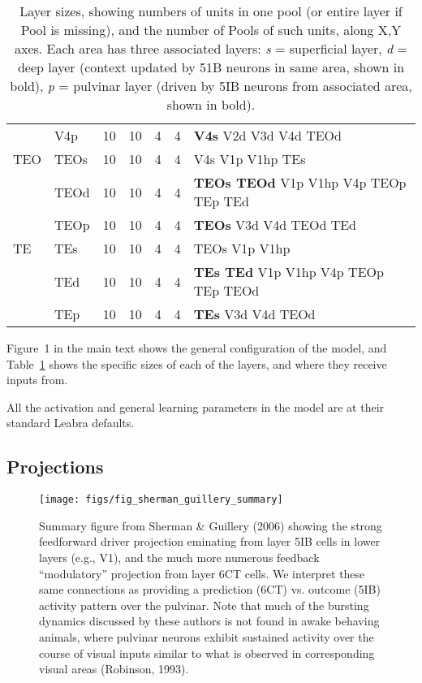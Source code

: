 \documentclass[12pt,twoside]{article}
\newif\myifpdf
\begin{document}
\begin{table}
\begin{tabular}{llrrlll}
   & V4p & 10 & 10 & 4 & 4 & {\bf V4s} V2d V3d V4d TEOd \\
TEO & TEOs & 10 & 10 & 4 & 4 & V4s V1p V1hp TEs\\
   & TEOd & 10 & 10 & 4 & 4 & {\bf TEOs TEOd} V1p V1hp V4p TEOp TEp TEd \\
   & TEOp & 10 & 10 & 4 & 4 & {\bf TEOs} V3d V4d TEOd TEd \\
TE & TEs & 10 & 10 & 4 & 4 & TEOs V1p V1hp \\
   & TEd & 10 & 10 & 4 & 4 & {\bf TEs TEd} V1p V1hp V4p TEOp TEp TEOd \\
   & TEp & 10 & 10 & 4 & 4 & {\bf TEs} V3d V4d TEOd \\
\hline
\end{tabular}
\caption{Layer sizes, showing numbers of units in one pool (or entire layer if Pool is missing), and the number of Pools of such units, along X,Y axes.  Each area has three associated layers: {\em s} = superficial layer, {\em d} = deep layer (context updated by 51B neurons in same area, shown in bold), {\em p} = pulvinar layer (driven by 5IB neurons from associated area, shown in bold).}
\label{tab.layer_sizes}
\end{table}

Figure~1 in the main text shows the general configuration of the model, and Table~\ref{tab.layer_sizes} shows the specific sizes of each of the layers, and where they receive inputs from. 

All the activation and general learning parameters in the model are at their standard Leabra defaults.

\subsection{Projections}

\begin{figure}
  \centering\texttt{[image: figs/fig\_sherman\_guillery\_summary]}
  \caption{Summary figure from Sherman \& Guillery (2006) showing the strong feedforward driver projection eminating from layer 5IB cells in lower layers (e.g., V1), and the much more numerous feedback ``modulatory'' projection from layer 6CT cells.  We interpret these same connections as providing a prediction (6CT) vs. outcome (5IB) activity pattern over the pulvinar.  Note that much of the bursting dynamics discussed by these authors is not found in awake behaving animals, where pulvinar neurons exhibit sustained activity over the course of visual inputs similar to what is observed in corresponding visual areas (Robinson, 1993).}
  \label{fig.sandg}
\end{figure}
\end{document}
